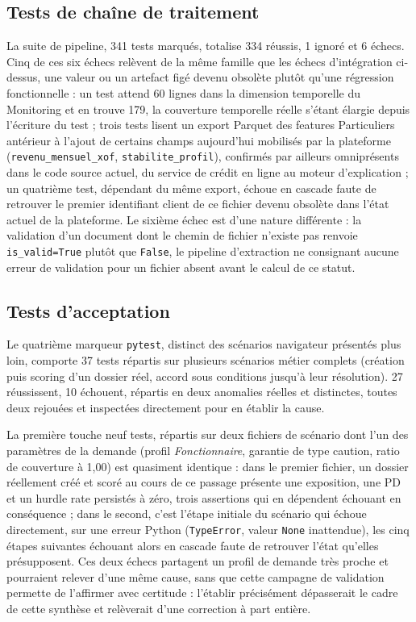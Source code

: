 \subsection{Tests de chaîne de traitement}

La suite de pipeline, 341 tests marqués, totalise 334 réussis, 1 ignoré et 6 échecs. Cinq de ces six échecs relèvent de la même famille que les échecs d'intégration ci-dessus, une valeur ou un artefact figé devenu obsolète plutôt qu'une régression fonctionnelle : un test attend 60 lignes dans la dimension temporelle du Monitoring et en trouve 179, la couverture temporelle réelle s'étant élargie depuis l'écriture du test ; trois tests lisent un export Parquet des features Particuliers antérieur à l'ajout de certains champs aujourd'hui mobilisés par la plateforme (\texttt{revenu\_mensuel\_xof}, \texttt{stabilite\_profil}), confirmés par ailleurs omniprésents dans le code source actuel, du service de crédit en ligne au moteur d'explication ; un quatrième test, dépendant du même export, échoue en cascade faute de retrouver le premier identifiant client de ce fichier devenu obsolète dans l'état actuel de la plateforme. Le sixième échec est d'une nature différente : la validation d'un document dont le chemin de fichier n'existe pas renvoie \texttt{is\_valid=True} plutôt que \texttt{False}, le pipeline d'extraction ne consignant aucune erreur de validation pour un fichier absent avant le calcul de ce statut.

\subsection{Tests d'acceptation}

Le quatrième marqueur \texttt{pytest}, distinct des scénarios navigateur présentés plus loin, comporte 37 tests répartis sur plusieurs scénarios métier complets (création puis scoring d'un dossier réel, accord sous conditions jusqu'à leur résolution). 27 réussissent, 10 échouent, répartis en deux anomalies réelles et distinctes, toutes deux rejouées et inspectées directement pour en établir la cause.

La première touche neuf tests, répartis sur deux fichiers de scénario dont l'un des paramètres de la demande (profil \emph{Fonctionnaire}, garantie de type caution, ratio de couverture à 1,00) est quasiment identique : dans le premier fichier, un dossier réellement créé et scoré au cours de ce passage présente une exposition, une PD et un hurdle rate persistés à zéro, trois assertions qui en dépendent échouant en conséquence ; dans le second, c'est l'étape initiale du scénario qui échoue directement, sur une erreur Python (\texttt{TypeError}, valeur \texttt{None} inattendue), les cinq étapes suivantes échouant alors en cascade faute de retrouver l'état qu'elles présupposent. Ces deux échecs partagent un profil de demande très proche et pourraient relever d'une même cause, sans que cette campagne de validation permette de l'affirmer avec certitude : l'établir précisément dépasserait le cadre de cette synthèse et relèverait d'une correction à part entière.

